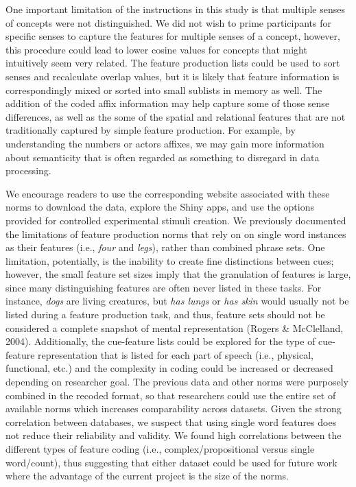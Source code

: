 \documentclass[english,,man]{apa6}
\theoremstyle{definition}
\theoremstyle{definition}
\theoremstyle{definition}
\theoremstyle{remark}
\begin{document}
One important limitation of the instructions in this study is that
multiple senses of concepts were not distinguished. We did not wish to
prime participants for specific senses to capture the features for
multiple senses of a concept, however, this procedure could lead to
lower cosine values for concepts that might intuitively seem very
related. The feature production lists could be used to sort senses and
recalculate overlap values, but it is likely that feature information is
correspondingly mixed or sorted into small sublists in memory as well.
The addition of the coded affix information may help capture some of
those sense differences, as well as the some of the spatial and
relational features that are not traditionally captured by simple
feature production. For example, by understanding the numbers or actors
affixes, we may gain more information about semanticity that is often
regarded as something to disregard in data processing.

We encourage readers to use the corresponding website associated with
these norms to download the data, explore the Shiny apps, and use the
options provided for controlled experimental stimuli creation. We
previously documented the limitations of feature production norms that
rely on on single word instances as their features (i.e., \emph{four}
and \emph{legs}), rather than combined phrase sets. One limitation,
potentially, is the inability to create fine distinctions between cues;
however, the small feature set sizes imply that the granulation of
features is large, since many distinguishing features are often never
listed in these tasks. For instance, \emph{dogs} are living creatures,
but \emph{has lungs} or \emph{has skin} would usually not be listed
during a feature production task, and thus, feature sets should not be
considered a complete snapshot of mental representation (Rogers \&
McClelland, 2004). Additionally, the cue-feature lists could be explored
for the type of cue-feature representation that is listed for each part
of speech (i.e., physical, functional, etc.) and the complexity in
coding could be increased or decreased depending on researcher goal. The
previous data and other norms were purposely combined in the recoded
format, so that researchers could use the entire set of available norms
which increases comparability across datasets. Given the strong
correlation between databases, we suspect that using single word
features does not reduce their reliability and validity. We found high
correlations between the different types of feature coding (i.e.,
complex/propositional versus single word/count), thus suggesting that
either dataset could be used for future work where the advantage of the
current project is the size of the norms.
\end{document}
